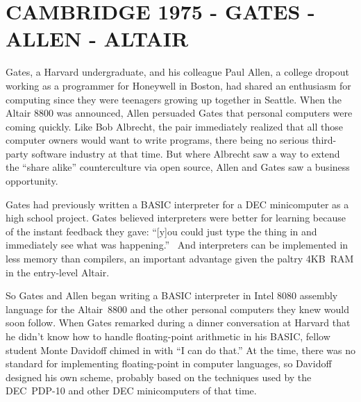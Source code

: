 
\section{CAMBRIDGE 1975 - GATES - ALLEN - ALTAIR}



Gates, a Harvard undergraduate, and his colleague 
Paul Allen, a college dropout working as a programmer for Honeywell
in Boston, had shared an enthusiasm for computing since they were
teenagers growing up together in Seattle.
When the Altair 8800 was announced,
Allen persuaded Gates that personal computers were coming quickly.
Like Bob Albrecht, the pair immediately realized that all those
computer owners would want to write programs, there being no serious third-party
software industry at that time.
But where Albrecht saw a way to extend the ``share alike''
counterculture via open source, Allen and Gates saw a business opportunity.

Gates had
previously written a BASIC interpreter for  a DEC 
minicomputer 
as a  high school project.  Gates believed interpreters were better for
learning because of the instant feedback they gave:
``[y]ou could just type
the thing in and immediately see what was
happening.''~\cite{smithsonian_interview} 
And interpreters can be implemented in less memory than compilers,
an important advantage given the paltry 4KB~RAM in the entry-level  Altair.

So Gates and Allen began writing a BASIC interpreter in Intel 8080
assembly language for the
Altair~8800 and the other personal computers they
knew would soon follow.
When Gates remarked during a dinner conversation at Harvard
that he didn't know how to handle floating-point arithmetic in his
BASIC, fellow student Monte Davidoff chimed in with ``I can do that.''
At the time, there was no standard for implementing floating-point in
computer languages, so Davidoff designed his own scheme, probably based
on the techniques used by the DEC~PDP-10 and other DEC minicomputers of
that time.

